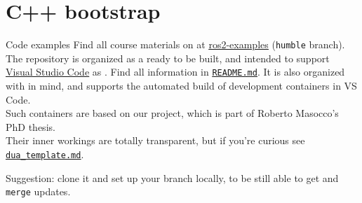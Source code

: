 
\section{C++ bootstrap}
\graphicspath{{figs/section2/}}

\begin{frame}{Code examples}
	Find all course materials on  at \href{https://github.com/IntelligentSystemsLabUTV/ros2-examples}{\color{blue}\underline{ros2-examples}} (\texttt{humble} branch).
	\newline\newline
	The repository is organized as a  ready to be built, and intended to support \href{https://code.visualstudio.com/}{\color{blue}\underline{Visual Studio Code}} as . Find all information in \href{https://github.com/IntelligentSystemsLabUTV/ros2-examples/blob/humble/README.md}{\color{blue}\underline{\texttt{README.md}}}.
	\newline\newline
	It is also organized with  in mind, and supports the automated build of development containers in VS Code.\\
	Such containers are based on our \href{https://github.com/IntelligentSystemsLabUTV/dua-template}{} project, which is part of Roberto Masocco's PhD thesis.\\
	Their inner workings are totally transparent, but if you're curious see \href{https://github.com/IntelligentSystemsLabUTV/ros2-examples/blob/humble/dua_template.md}{\color{blue}\underline{\texttt{dua\_template.md}}}.
	\begin{block}{}
		\centering
		Suggestion: clone it and set up your branch locally, to be still able to get and \texttt{merge} updates.
	\end{block}
\end{frame}

